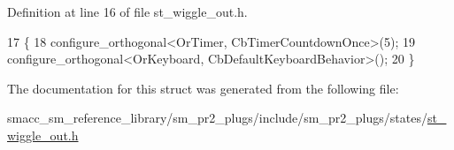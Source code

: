 Definition at line 16 of file st\+\_\+wiggle\+\_\+out.\+h.


\begin{DoxyCode}
17     \{
18         configure\_orthogonal<OrTimer,  CbTimerCountdownOnce>(5);    
19         configure\_orthogonal<OrKeyboard, CbDefaultKeyboardBehavior>();
20     \}
\end{DoxyCode}


The documentation for this struct was generated from the following file\+:\begin{DoxyCompactItemize}
\item 
smacc\+\_\+sm\+\_\+reference\+\_\+library/sm\+\_\+pr2\+\_\+plugs/include/sm\+\_\+pr2\+\_\+plugs/states/\hyperlink{st__wiggle__out_8h}{st\+\_\+wiggle\+\_\+out.\+h}\end{DoxyCompactItemize}

